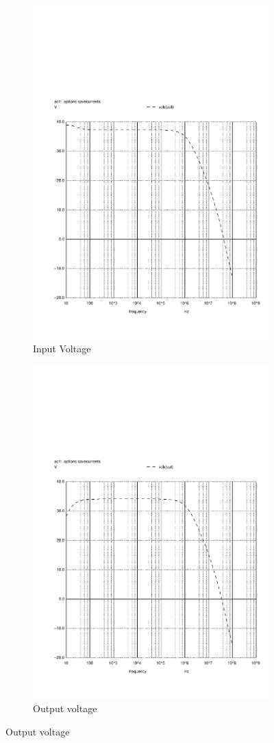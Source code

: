 \begin{figure}[ht]
\centering
\begin{subfigure}{.5\textwidth}
  \centering
  \includegraphics[width=.75\linewidth]{vo1f.pdf}
  \caption{Input Voltage}
  \label{fig:sim4}
\end{subfigure}%
\begin{subfigure}{.5\textwidth}
  \centering
  \includegraphics[width=.75\linewidth]{vo2f.pdf}
  \caption{Output voltage}
  \label{fig:sim5}
\end{subfigure}
\end{figure}


